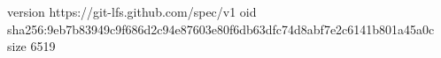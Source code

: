 version https://git-lfs.github.com/spec/v1
oid sha256:9eb7b83949c9f686d2c94e87603e80f6db63dfc74d8abf7e2c6141b801a45a0c
size 6519
